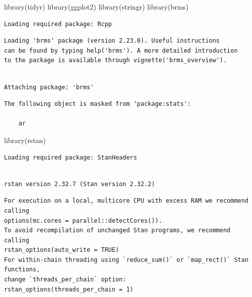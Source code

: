 \documentclass[
  letterpaper,
  DIV=11,
  numbers=noendperiod]{scrartcl}
\newenvironment{Shaded}{\begin{snugshade}}{\end{snugshade}}
\newcommand{\FunctionTok}[1]{\textcolor[rgb]{0.28,0.35,0.67}{#1}}
\newcommand{\NormalTok}[1]{\textcolor[rgb]{0.00,0.23,0.31}{#1}}
\begin{document}
\begin{Shaded}
\begin{Highlighting}[]
\FunctionTok{library}\NormalTok{(tidyr)}
\FunctionTok{library}\NormalTok{(ggplot2)}
\FunctionTok{library}\NormalTok{(stringr)}
\FunctionTok{library}\NormalTok{(brms)}
\end{Highlighting}
\end{Shaded}

\begin{verbatim}
Loading required package: Rcpp
\end{verbatim}

\begin{verbatim}
Loading 'brms' package (version 2.23.0). Useful instructions
can be found by typing help('brms'). A more detailed introduction
to the package is available through vignette('brms_overview').
\end{verbatim}

\begin{verbatim}

Attaching package: 'brms'
\end{verbatim}

\begin{verbatim}
The following object is masked from 'package:stats':

    ar
\end{verbatim}

\begin{Shaded}
\begin{Highlighting}[]
\FunctionTok{library}\NormalTok{(rstan)}
\end{Highlighting}
\end{Shaded}

\begin{verbatim}
Loading required package: StanHeaders
\end{verbatim}

\begin{verbatim}

rstan version 2.32.7 (Stan version 2.32.2)
\end{verbatim}

\begin{verbatim}
For execution on a local, multicore CPU with excess RAM we recommend calling
options(mc.cores = parallel::detectCores()).
To avoid recompilation of unchanged Stan programs, we recommend calling
rstan_options(auto_write = TRUE)
For within-chain threading using `reduce_sum()` or `map_rect()` Stan functions,
change `threads_per_chain` option:
rstan_options(threads_per_chain = 1)
\end{verbatim}
\end{document}
